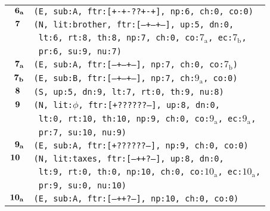 \documentclass{article}
\begin{document}
\begin{minipage}{\textwidth}
{\begin{tabular}{|r|l|}
    ${\textbf{\textrm{6}}_{\textbf{\textrm{a}}}}$ & \texttt{\texttt{(E,~sub:A,~ftr:[+-+-??+-+],~np:6,~ch:0,~co:0)}} \\
    ${\textbf{\textrm{7}}_{\phantom{z}}}$ & \texttt{\texttt{(N,~lit:brother,~ftr:[---+--+--],~up:5,~dn:0,}} \\
    & \texttt{\texttt{~lt:6,~rt:8,~th:8,~np:7,~ch:0,~co:${\textrm{7}_{\textrm{a}}}$,~ec:${\textrm{7}_{\textrm{b}}}$,}} \\
    & \texttt{\texttt{~pr:6,~su:9,~nu:7)}} \\
    ${\textbf{\textrm{7}}_{\textbf{\textrm{a}}}}$ & \texttt{\texttt{(E,~sub:A,~ftr:[---+--+--],~np:7,~ch:0,~co:${\textrm{7}_{\textrm{b}}}$)}} \\
    ${\textbf{\textrm{7}}_{\textbf{\textrm{b}}}}$ & \texttt{\texttt{(E,~sub:B,~ftr:[---+--+--],~np:7,~ch:${\textrm{9}_{\textrm{a}}}$,~co:0)}} \\
    ${\textbf{\textrm{8}}_{\phantom{z}}}$ & \texttt{\texttt{(S,~up:5,~dn:9,~lt:7,~rt:0,~th:9,~nu:8)}} \\
    ${\textbf{\textrm{9}}_{\phantom{z}}}$ & \texttt{\texttt{(N,~lit:$\phi$,~ftr:[+??????--],~up:8,~dn:0,}} \\
    & \texttt{\texttt{~lt:0,~rt:10,~th:10,~np:9,~ch:0,~co:${\textrm{9}_{\textrm{a}}}$,~ec:${\textrm{9}_{\textrm{a}}}$,}} \\
    & \texttt{\texttt{~pr:7,~su:10,~nu:9)}} \\
    ${\textbf{\textrm{9}}_{\textbf{\textrm{a}}}}$ & \texttt{\texttt{(E,~sub:A,~ftr:[+??????--],~np:9,~ch:0,~co:0)}} \\
    ${\textbf{\textrm{10}}_{\phantom{z}}}$ & \texttt{\texttt{(N,~lit:taxes,~ftr:[---++?---],~up:8,~dn:0,}} \\
    & \texttt{\texttt{~lt:9,~rt:0,~th:0,~np:10,~ch:0,~co:${\textrm{10}_{\textrm{a}}}$,~ec:${\textrm{10}_{\textrm{a}}}$,}} \\
    & \texttt{\texttt{~pr:9,~su:0,~nu:10)}} \\
    ${\textbf{\textrm{10}}_{\textbf{\textrm{a}}}}$ & \texttt{\texttt{(E,~sub:A,~ftr:[---++?---],~np:10,~ch:0,~co:0)}} \\
    \hline
  \end{tabular}
  }
\end{minipage}
\bigbreak

\clearpage

%
%
\end{document}

